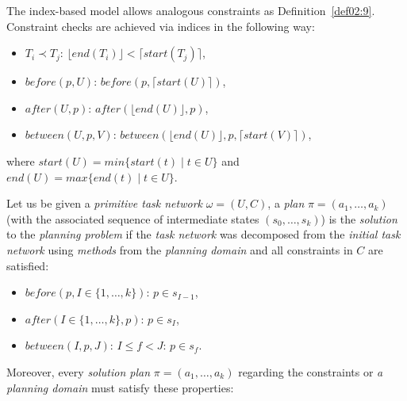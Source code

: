\medskip\noindent
The index-based model allows analogous constraints as Definition~\ref{def02:9}. Constraint checks are achieved via indices in the following way:

\begin{itemize}
    \item $T_i \prec T_j$: $\lfloor end(T_i) \rfloor < \lceil start(T_j) \rceil$,

    \item $before(p, U)$: $before(p, \lceil start(U) \rceil)$,

    \item $after(U, p)$: $after(\lfloor end(U) \rfloor, p)$,

    \item $between(U, p, V)$: $between(\lfloor end(U) \rfloor, p, \lceil start(V) \rceil)$,
\end{itemize}

\noindent
where $start(U) = min\{start(t) \; | \; t \in U\}$ and $end(U) = max\{end(t) \; | \; t \in U\}$.

\medskip\noindent
Let us be given a \emph{primitive task network} $\omega = (U, C)$, a \emph{plan} $\pi = (a_1, \dots, a_k)$ (with the associated sequence of intermediate states $(s_0, \dots, s_k)$) is the \emph{solution} to the \emph{planning problem} if the \emph{task network} was decomposed from the \emph{initial task network} using \emph{methods} from the \emph{planning domain} and all constraints in $C$ are satisfied:

\begin{itemize}
    \item $before(p, I \in \{1, \dots, k\})$: $p \in s_{I - 1}$,

    \item $after(I \in \{1, \dots, k\}, p)$: $p \in s_{I}$,

    \item $between(I, p, J)$: $I \leq f < J$: $p \in s_f$.
\end{itemize}

\noindent
Moreover, every \emph{solution plan} $\pi = (a_1, \dots, a_k)$ regarding the constraints or \emph{a planning domain} must satisfy these properties:

